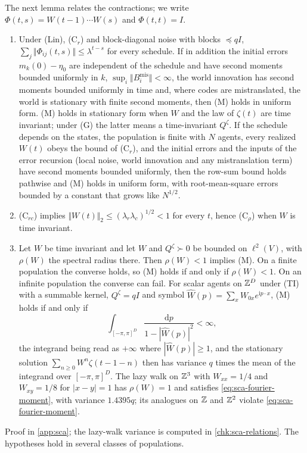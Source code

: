 
The next lemma relates the contractions; we write $\Phi(t,s)=W(t-1)\cdots W(s)$ and $\Phi(t,t)=I$.

\begin{lemma}\label{lem:sca-relations}
\begin{enumerate}
\item[(a)] Under \textup{(Lin)}, \textup{(C$_r$)} and block-diagonal noise with blocks $\preceq qI$, $\sum_j\Vert\Phi_{ij}(t,s)\Vert\le\lambda^{t-s}$ for every schedule. If in addition the initial errors $m_k(0)-\eta_0$ are independent of the schedule and have second moments bounded uniformly in $k$, $\sup_i\Vert B^{\mathrm{mis}}_i\Vert<\infty$, the world innovation has second moments bounded uniformly in time and, where codes are mistranslated, the world is stationary with finite second moments, then \textup{(M)} holds in uniform form. \textup{(M)} holds in stationary form when $W$ and the law of $\zeta(t)$ are time invariant; under \textup{(G)} the latter means a time-invariant $Q^\zeta$. If the schedule depends on the states, the population is finite with $N$ agents, every realized $W(t)$ obeys the bound of \textup{(C$_r$)}, and the initial errors and the inputs of the error recursion (local noise, world innovation and any mistranslation term) have second moments bounded uniformly, then the row-sum bound holds pathwise and \textup{(M)} holds in uniform form, with root-mean-square errors bounded by a constant that grows like $N^{1/2}$.
\item[(b)] \textup{(C$_{rc}$)} implies $\Vert W(t)\Vert_2\le(\lambda_r\lambda_c)^{1/2}<1$ for every $t$, hence \textup{(C$_\rho$)} when $W$ is time invariant.
\item[(c)] Let $W$ be time invariant and let $W$ and $Q^\zeta\succ0$ be bounded on $\ell^2(V)$, with $\rho(W)$ the spectral radius there. Then $\rho(W)<1$ implies \textup{(M)}. On a finite population the converse holds, so \textup{(M)} holds if and only if $\rho(W)<1$. On an infinite population the converse can fail. For scalar agents on $\mathbb{Z}^D$ under \textup{(TI)} with a summable kernel, $Q^\zeta=qI$ and symbol $\hat W(p)=\sum_xW_{0x}e^{\mathrm ip\cdot x}$, \textup{(M)} holds if and only if
\begin{equation}\label{eq:sca-fourier-moment}
\int_{[-\pi,\pi]^D}\frac{\mathrm dp}{1-|\hat W(p)|^2}<\infty,
\end{equation}
the integrand being read as $+\infty$ where $|\hat W(p)|\ge1$, and the stationary solution $\sum_{n\ge0}W^n\zeta(t-1-n)$ then has variance $q$ times the mean of the integrand over $[-\pi,\pi]^D$. The lazy walk on $\mathbb{Z}^3$ with $W_{xx}=1/4$ and $W_{xy}=1/8$ for $|x-y|=1$ has $\rho(W)=1$ and satisfies \eqref{eq:sca-fourier-moment}, with variance $1.4395q$; its analogues on $\mathbb{Z}$ and $\mathbb{Z}^2$ violate \eqref{eq:sca-fourier-moment}.
\end{enumerate}
\end{lemma}
Proof in \cref{app:sca}; the lazy-walk variance is computed in \cref{chk:sca-relations}. The hypotheses hold in several classes of populations.

